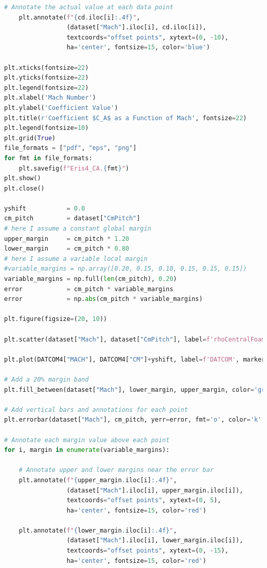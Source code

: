 \documentclass[12pt]{article}
\begin{document}
\begin{lstlisting}[language=Python, caption=Python script used to post-process numerical solutions. To report bugs email to: lorenzo.campoli@gspace.com, label=lst:pp]
   # Annotate the actual value at each data point
    plt.annotate(f"{cd.iloc[i]:.4f}", 
                 (dataset["Mach"].iloc[i], cd.iloc[i]), 
                 textcoords="offset points", xytext=(0, -10),
                 ha='center', fontsize=15, color='blue')

plt.xticks(fontsize=22)
plt.yticks(fontsize=22)
plt.legend(fontsize=22)
plt.xlabel('Mach Number')
plt.ylabel('Coefficient Value')
plt.title(r'Coefficient $C_A$ as a Function of Mach', fontsize=22)
plt.legend(fontsize=10)
plt.grid(True)
file_formats = ["pdf", "eps", "png"]
for fmt in file_formats:
    plt.savefig(f"Eris4_CA.{fmt}")
plt.show()
plt.close()

yshift           = 0.0
cm_pitch         = dataset["CmPitch"]
# here I assume a constant global margin
upper_margin     = cm_pitch * 1.20  
lower_margin     = cm_pitch * 0.80 
# here I assume a variable local margin
#variable_margins = np.array([0.20, 0.15, 0.10, 0.15, 0.15, 0.15])
variable_margins = np.full(len(cm_pitch), 0.20)
error            = cm_pitch * variable_margins 
error            = np.abs(cm_pitch * variable_margins)

plt.figure(figsize=(20, 10))

plt.scatter(dataset["Mach"], dataset["CmPitch"], label=f'rhoCentralFoam', s=200, marker='p', color='g', linestyle='dotted')

plt.plot(DATCOM4["MACH"], DATCOM4["CM"]+yshift, label=f'DATCOM', marker='p', linestyle=':', color='gray')

# Add a 20% margin band 
plt.fill_between(dataset["Mach"], lower_margin, upper_margin, color='green', alpha=0.2, label='20% Margin Band')

# Add vertical bars and annotations for each point
plt.errorbar(dataset["Mach"], cm_pitch, yerr=error, fmt='o', color='k', capsize=10, label='Local Margin')

# Annotate each margin value above each point
for i, margin in enumerate(variable_margins):

    # Annotate upper and lower margins near the error bar
    plt.annotate(f"{upper_margin.iloc[i]:.4f}", 
                 (dataset["Mach"].iloc[i], upper_margin.iloc[i]), 
                 textcoords="offset points", xytext=(0, 5),
                 ha='center', fontsize=15, color='red')
    
    plt.annotate(f"{lower_margin.iloc[i]:.4f}", 
                 (dataset["Mach"].iloc[i], lower_margin.iloc[i]), 
                 textcoords="offset points", xytext=(0, -15),
                 ha='center', fontsize=15, color='red')


\end{lstlisting}
\end{document}
